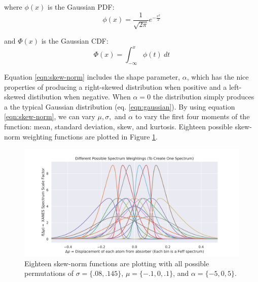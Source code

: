 \noindent
where $ \phi(x) $ is the Gaussian PDF:
\begin{equation}
	\label{eqn:skew-norm-pdf}
	\phi (x)={\frac  {1}{{\sqrt  {2\pi }}}}e^{{-{\frac  {x^{2}}{2}}}}
\end{equation}

\noindent
and $ \Phi (x) $ is the Gaussian CDF:
\begin{equation}
	\label{eqn:skew-norm-cdf}
	\Phi (x)=\int _{{-\infty }}^{{x}}\phi (t)\ dt
\end{equation}



\noindent
Equation \ref{eqn:skew-norm} includes the shape parameter, $ \alpha $, which has the nice properties of producing a right-skewed distribution when positive and a left-skewed distibution when negative. When $ \alpha=0 $ the distribution simply produces a the typical Gaussian distribution (eq. \ref{eqn:gaussian}). By using equation \ref{eqn:skew-norm}, we can vary $ \mu, \sigma,  $ and $ \alpha $ to vary the first four moments of the function: mean, standard deviation, skew, and kurtosis. Eighteen possible skew-norm weighting functions are plotted in Figure \ref{fig:skew-norm-options}. 

\begin{figure}[h!]
	\centering
	\includegraphics[width=\linewidth]{Chapters/Figures/skewnorm_options.png}
	\caption[Simulated Disordered Spectrum Weightings]{Eighteen skew-norm functions are plotting with all possible permutations of $ \sigma=\{.08, .145\} $, $ \mu=\{-.1, 0, .1\} $, and $ \alpha=\{-5,0,5\} $.}
	\label{fig:skew-norm-options}
\end{figure}



